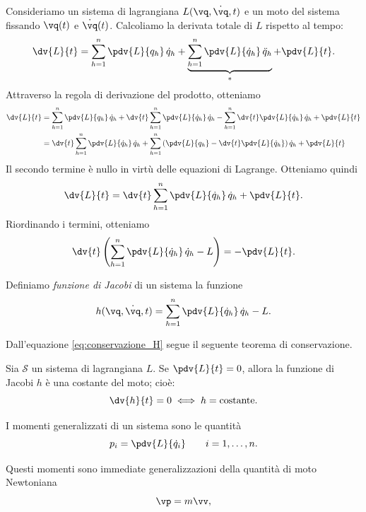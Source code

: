 Consideriamo un sistema di lagrangiana $L(\vq, \dot{\vq}, t)$ e un moto del sistema fissando $\vq(t)$ e $\dot{\vq}(t)$. Calcoliamo la derivata totale di $L$ rispetto al tempo:
\begin{equation*}
    \dv{L}{t} = \sum_{h=1}^n \pdv{L}{q_h}\,\dot{q}_h + \underbrace{\sum_{h=1}^n \pdv{L}{\dot{q}_h}\,\ddot{q}_h}_{*} + \pdv{L}{t}.
\end{equation*}
Attraverso la regola di derivazione del prodotto, otteniamo
\begin{align*}
    \dv{L}{t} &= \sum_{h=1}^n \pdv{L}{q_h}\,\dot{q}_h + \dv{t}\sum_{h=1}^n \pdv{L}{\dot{q}_h}\,\dot{q}_h - \sum_{h=1}^n \dv{t}\pdv{L}{\dot{q}_h}\,\dot{q}_h + \pdv{L}{t} \\
    &= \dv{t} \sum_{h=1}^n \pdv{L}{\dot{q}_h}\,\dot{q}_h + \sum_{h=1}^n \left(\pdv{L}{q_h} - \dv{t}\pdv{L}{\dot{q}_h}\right)\dot{q}_h + \pdv{L}{t} \\
\end{align*}
Il secondo termine è nullo in virtù delle equazioni di Lagrange. Otteniamo quindi
\begin{equation*}
    \dv{L}{t} = \dv{t} \sum_{h=1}^n \pdv{L}{\dot{q}_h}\,\dot{q}_h + \pdv{L}{t}.
\end{equation*}
Riordinando i termini, otteniamo
\begin{equation}
    \label{eq:conservazione_H}
    \dv{t}\left(\sum_{h=1}^n \pdv{L}{\dot{q}_h}\,\dot{q}_h - L\right) = -\pdv{L}{t}.
\end{equation}

\begin{definition}
    Definiamo \emph{funzione di Jacobi} di un sistema la funzione
    \begin{equation*}
        h(\vq, \dot{\vq}, t) = \sum_{h=1}^n \pdv{L}{\dot{q}_h}\,\dot{q}_h - L.
    \end{equation*}
\end{definition}

Dall'equazione \eqref{eq:conservazione_H} segue il seguente teorema di conservazione.

\begin{theorem}
    Sia $\mathcal{S}$ un sistema di lagrangiana $L$. Se $\pdv{L}{t} = 0$, allora la funzione di Jacobi $h$ è una costante del moto; cioè:
    \begin{equation*}
        \dv{h}{t} = 0 \iff h = \text{costante}.
    \end{equation*}
\end{theorem}

\begin{definition}
    I momenti generalizzati di un sistema sono le quantità
    \begin{equation*}
        p_i = \pdv{L}{\dot{q}_i} \qquad i = 1, \dots, n.
    \end{equation*}
\end{definition}
Questi momenti sono immediate generalizzazioni della quantità di moto Newtoniana
\begin{equation*}
    \vp = m\vv,
\end{equation*}

